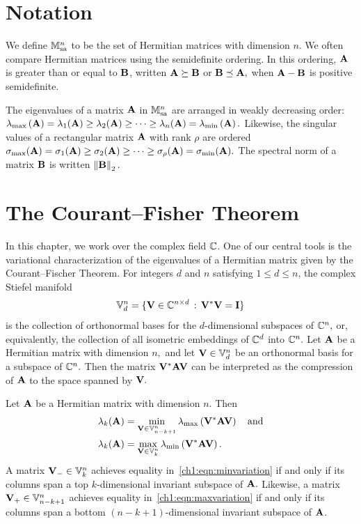 \section{Notation}
\label{ch1:sec:notation}

 We define $\mathbb{M}^{n}_{\mathrm{sa}}$ to be the set of Hermitian matrices with 
 dimension $n.$ We often compare Hermitian matrices using the semidefinite ordering. 
 In this ordering, $\mathbf{A}$ is greater than or equal to $\mathbf{B}$, written 
 $\mathbf{A} \succeq \mathbf{B}$ or $\mathbf{B} \preceq \mathbf{A},$ when 
 $\mathbf{A} - \mathbf{B}$ is positive semidefinite. 


 The eigenvalues of a matrix $\mathbf{A}$ in $\mathbb{M}^{n}_{\mathrm{sa}}$ are arranged in weakly decreasing order: 
 $\lambda_{\mathrm{max}}\left(\mathbf{A}\right) = \lambda_1(\mathbf{A}) \geq \lambda_2(\mathbf{A}) \geq \cdots \geq \lambda_n(\mathbf{A}) = \lambda_{\mathrm{min}}\left(\mathbf{A}\right).$ 
 Likewise, the singular values of a rectangular matrix $\mathbf{A}$ with rank $\rho$ are ordered 
 $\sigma_{\max}(\mathbf{A}) = \sigma_1(\mathbf{A}) \geq \sigma_2(\mathbf{A}) \geq \cdots \geq \sigma_\rho(\mathbf{A}) = \sigma_{\min}(\mathbf{A}).$ 
 The spectral norm of a matrix $\mathbf{B}$ is written
 $\left\|\mathbf{B}\right\|_2.$
 
 
\section{The Courant--Fisher Theorem}
\label{ch1:sec:background}
In this chapter, we work over the complex field $\mathbb{C}$. One of our central tools is the variational 
characterization of the eigenvalues of a Hermitian matrix given by the Courant--Fischer Theorem. 
For integers $d$ and $n$ satisfying $1 \leq d \leq n$, the complex Stiefel
manifold 
\[\mathbb{V}_{d}^{n} = \{\mathbf{V} \in \mathbb{C}^{n \times d} \,:\, \mathbf{V}^* \mathbf{V} =
\mathbf{I} \}
\]
is the collection of orthonormal bases for the $d$-dimensional subspaces of
$\mathbb{C}^n,$ or, equivalently, the collection of all isometric embeddings of $\mathbb{C}^d$
into $\mathbb{C}^n.$ Let $\mathbf{A}$ be a Hermitian matrix with dimension $n,$ and let
$\mathbf{V} \in \mathbb{V}_{d}^{n}$ be an orthonormal basis for a subspace of $\mathbb{C}^n.$ Then
the matrix $\mathbf{V}^* \mathbf{A} \mathbf{V}$ can be interpreted as the compression
of $\mathbf{A}$ to the space spanned by $\mathbf{V}.$

\begin{prop}
\label{ch1:prop:isometrycf}
Let $\mathbf{A}$ be a Hermitian matrix with dimension $n$. Then
\begin{align}
\lambda_k(\mathbf{A}) & = \min_{\mathbf{V} \in \mathbb{V}_{n-k+1}^{n}}
\lambda_{\mathrm{max}}\left(\mathbf{V}^*\mathbf{AV}\right) \quad \text{and}
\label{ch1:eqn:maxvariation} \\
\lambda_k(\mathbf{A}) & = \max_{\mathbf{V} \in \mathbb{V}_{k}^{n}} \lambda_{\mathrm{min}}\left(\mathbf{V}^*
\mathbf{AV}\right). \label{ch1:eqn:minvariation}
\end{align}
A matrix $\mathbf{V}_- \in \mathbb{V}_{k}^{n}$ achieves equality
in~\eqref{ch1:eqn:minvariation} if and only if its columns span a top
$k$-dimensional invariant subspace of $\mathbf{A}.$ Likewise, a matrix $\mathbf{V}_+
\in \mathbb{V}_{n-k+1}^{n}$ achieves equality in~\eqref{ch1:eqn:maxvariation} if and only
if its columns span a bottom $(n-k+1)$-dimensional invariant subspace of
$\mathbf{A}$.
\end{prop}

